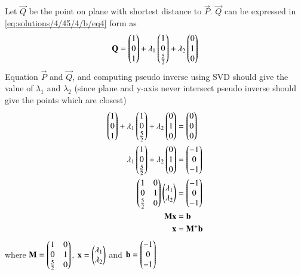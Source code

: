 Let $\vec{Q}$ be the point on plane with shortest distance to $\vec{P}$. $\vec{Q}$ can be expressed in \eqref{eq:solutions/4/45/4/b/eq4} form as
\begin{align}\label{eq:solutions/4/45/4/b/eq6}
	\mathbf{Q} = \begin{pmatrix}1\\0\\1\end{pmatrix} + \lambda_1\begin{pmatrix}1\\0\\\frac{5}{2}\end{pmatrix} + \lambda_2\begin{pmatrix}0\\1\\0\end{pmatrix}
\end{align}
Equation $\vec{P}$ and $\vec{Q}$, and computing pseudo inverse using SVD should give the value of $\lambda_1$ and $\lambda_2$ (since plane and y-axis never intersect pseudo inverse should give the points which are closest)
\begin{align}
	\label{eq:solutions/4/45/4/b/eq7}\begin{pmatrix}1\\0\\1\end{pmatrix} + \lambda_1\begin{pmatrix}1\\0\\\frac{5}{2}\end{pmatrix} + \lambda_2\begin{pmatrix}0\\1\\0\end{pmatrix} &= \begin{pmatrix}0\\0\\0\end{pmatrix}\\
	\label{eq:solutions/4/45/4/b/eq8}\lambda_1\begin{pmatrix}1\\0\\\frac{5}{2}\end{pmatrix} + \lambda_2\begin{pmatrix}0\\1\\0\end{pmatrix} &= \begin{pmatrix}-1\\0\\-1\end{pmatrix}\\
	\label{eq:solutions/4/45/4/b/eq9}\begin{pmatrix}1 & 0\\0 & 1\\\frac{5}{2} & 0\end{pmatrix} \begin{pmatrix}\lambda_1 \\ \lambda_2\end{pmatrix} &=\begin{pmatrix}-1\\0\\-1\end{pmatrix}\\
	\label{eq:solutions/4/45/4/b/eq10}\mathbf{M}\mathbf{x} &= \mathbf{b}\\
	\label{eq:solutions/4/45/4/b/eq11}\mathbf{x} &= \mathbf{M}^{+}\mathbf{b}
\end{align}
where $\mathbf{M} = \begin{pmatrix}1 & 0\\0 & 1\\\frac{5}{2} & 0\end{pmatrix}$, $\mathbf{x}= \begin{pmatrix}\lambda_1 \\ \lambda_2\end{pmatrix}$ and $\mathbf{b}=\begin{pmatrix}-1\\0\\-1\end{pmatrix}$\\
